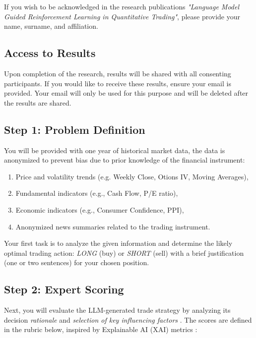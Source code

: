 \documentclass[8pt]{scrartcl}
\begin{document}
If you wish to be acknowledged in the research publications \textit{"Language Model Guided Reinforcement Learning in Quantitative Trading"}, please provide your name, surname, and affiliation.

\subsection{Access to Results}

Upon completion of the research, results will be shared with all consenting participants. If you would like to receive these results, ensure your email is provided. Your email will only be used for this purpose and will be deleted after the results are shared.

\subsection{Step 1: Problem Definition}

You will be provided with one year of historical market data, the data is anonymized to prevent bias due to prior knowledge of the financial instrument:
\begin{enumerate}
    \item Price and volatility trends (e.g. Weekly Close, Otions IV, Moving Averages),
    \item Fundamental indicators (e.g., Cash Flow, P/E ratio),
    \item Economic indicators (e.g., Consumer Confidence, PPI),
    \item Anonymized news summaries related to the trading instrument.
\end{enumerate}

Your first task is to analyze the given information and determine the likely optimal trading action: \textit{LONG} (buy) or \textit{SHORT} (sell) with a brief justification (one or two sentences) for your chosen position.

\subsection{Step 2: Expert Scoring}

Next, you will evaluate the LLM-generated trade strategy by analyzing its decision \textit{rationale} \citep{vats2024surveyhumanaiteaminglarge} and \textit{selection of key influencing factors} \citep{wang2024llmfactorextractingprofitablefactors}. The scores are defined in the rubric below, inspired by Explainable AI (XAI) metrics \citet{Demajo_2020, xai_Khawaga_2023}:
\end{document}
